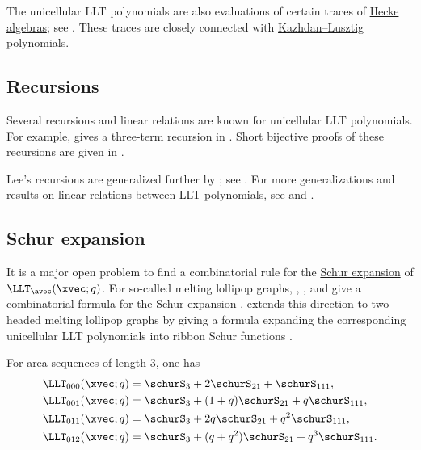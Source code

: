 The unicellular LLT polynomials are also evaluations of certain traces of
\hyperref[heckeAlgebra]{Hecke algebras}; see \cite{MoralesSkanderaWang2024}.
These traces are closely connected with
\hyperref[kazhdanLusztigPolynomials]{Kazhdan--Lusztig polynomials}.


\subsection[unicellularLLTRecursions]{Recursions}

Several recursions and linear relations are known for unicellular LLT
polynomials.  For example,  gives a three-term recursion
in \cite{Lee2020}.  Short bijective proofs of these recursions are given in
\cite{Alexandersson2019llt}.

Lee's recursions are generalized further by ; see
\cite[Eq. (2.2)]{Miller2019}.  For more generalizations and results on linear
relations between LLT polynomials, see \cite{Tom2020x} and \cite{Keating2021x}.


\subsection[unicellularLLTSchurExpansion]{Schur expansion}

It is a major open problem to find a combinatorial rule for the
\hyperref[schurPositivity]{Schur expansion} of $\LLT_\avec(\xvec;q)$.  For
so-called melting lollipop graphs, , , and
 give a combinatorial formula for the Schur expansion
\cite{HuhNamYoo2020}.
 extends this direction to two-headed melting lollipop
graphs by giving a formula expanding the corresponding unicellular LLT
polynomials into ribbon Schur functions \cite{WangLollipopLLT2025x}.

\begin{example*}
For area sequences of length $3$, one has
\begin{align*}
\LLT_{000}(\xvec;q)&=\schurS_{3}+2\schurS_{21}+\schurS_{111}, \\
\LLT_{001}(\xvec;q)&=\schurS_{3}+(1+q)\schurS_{21}+q\schurS_{111}, \\
\LLT_{011}(\xvec;q)&=\schurS_{3}+2q\schurS_{21}+q^2\schurS_{111}, \\
\LLT_{012}(\xvec;q)&=\schurS_{3}+(q+q^2)\schurS_{21}+q^3\schurS_{111}.
\end{align*}
\end{example*}

